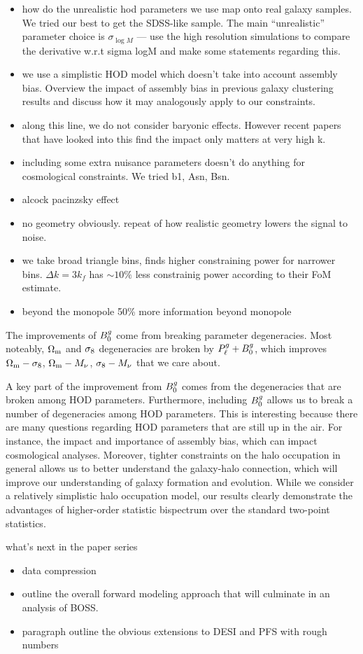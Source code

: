 

\begin{itemize}
    \item how do the unrealistic hod parameters we use map onto real galaxy
        samples. We tried our best to get the SDSS-like sample. The main
        ``unrealistic'' parameter choice is $\sigma_{\log M}$ --- use the
        high resolution simulations to compare the derivative w.r.t sigma logM
        and make some statements regarding this. 
    \item we use a simplistic HOD model which doesn't take into account
        assembly bias. Overview the impact of assembly bias in previous galaxy
        clustering results and discuss how it may analogously apply to our
        constraints.
    \item along this line, we do not consider baryonic effects. However recent
        papers that have looked into this find the impact only matters at very
        high k.  
    \item including some extra nuisance parameters doesn't do anything for
        cosmological constraints. We tried b1, Asn, Bsn.  
    \item alcock pacinzsky effect
    \item no geometry obviously. repeat of how realistic geometry lowers the
        signal to noise. 
    \item we take broad triangle bins, \cite{yankelevich2019} finds higher
        constraining power for narrower bins. $\Delta k = 3 k_f$ has
        ${\sim}10\%$ less constrainig power according to their FoM estimate.  
    \item beyond the monopole \cite{yankelevich2019} 50\% more information
        beyond monopole 
\end{itemize}

The improvements of $B^g_0$ come from breaking parameter degeneracies. 
Most noteably, $\Omega_{\rm m}$ and $\sigma_8$ degeneracies are broken by
$P^g_{\ell} + B^g_0$, which improves $\Omega_{\rm m} - \sigma_8$, $\Omega_{\rm m} - M_\nu$, $\sigma_8-M_\nu$ that we care about. 

A key part of the improvement from $B^g_0$ comes from the degeneracies that are
broken among HOD parameters. 
Furthermore, including $B^g_0$ allows us to break a number of degeneracies among
HOD parameters. This is interesting because there are many questions regarding
HOD parameters that are still up in the air. For instance, the impact and
importance of assembly bias, which can impact cosmological analyses. Moreover,
tighter constraints on the halo occupation in general allows us to better 
understand the galaxy-halo connection, which will improve our understanding of
galaxy formation and evolution. While we consider a relatively simplistic halo
occupation model, our results clearly demonstrate the advantages of
higher-order statistic bispectrum over the standard two-point statistics. 

what's next in the paper series 
\begin{itemize}
    \item data compression 
    \item outline the overall forward modeling approach that will culminate in
        an analysis of BOSS. 
    \item paragraph outline the obvious extensions to DESI and PFS with rough
        numbers 
\end{itemize}
